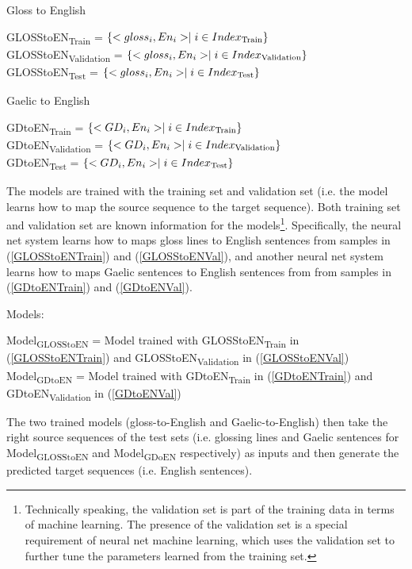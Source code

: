 \documentclass[a4paper]{article}
\begin{document}
\begin{exe}
	\ex Gloss to English
		\begin{xlist}
		\ex \label{GLOSStoENTrain} GLOSStoEN\textsubscript{Train}   = $\{<gloss_i,En_i>  \mid i \in Index\textsubscript{Train} \}$ \\
		\ex \label{GLOSStoENVal} GLOSStoEN\textsubscript{Validation}   = $\{<gloss_i,En_i>  \mid i \in Index\textsubscript{Validation} \}$ \\
		\ex \label{GLOSStoENTest}GLOSStoEN\textsubscript{Test} = $\{<gloss_i,En_i>  \mid i \in Index\textsubscript{Test} \}$ \\
		\end{xlist}
	
	\ex Gaelic to English
		\begin{xlist}
		\ex \label{GDtoENTrain} GDtoEN\textsubscript{Train}   = $\{<GD_i,En_i>  \mid i \in Index\textsubscript{Train} \}$ \\
		\ex \label{GDtoENVal} GDtoEN\textsubscript{Validation}   = $\{<GD_i,En_i>  \mid i \in Index\textsubscript{Validation} \}$ \\
		\ex \label{GDtoENTest} GDtoEN\textsubscript{Test}    = $\{<GD_i,En_i>  \mid i \in Index\textsubscript{Test} \}$ \\
		\end{xlist}
\end{exe}
The models are trained with the training set and validation set (i.e. the model learns how to map the source sequence to the target sequence). Both training set and validation set are known information for the models\footnote{Technically speaking, the validation set is part of the training data in terms of machine learning. The presence of the validation set is a special requirement of neural net machine learning, which uses the validation set to further tune the parameters learned from the training set.}. Specifically, the neural net system learns how to maps gloss lines to English sentences from samples in (\ref{GLOSStoENTrain}) and (\ref{GLOSStoENVal}), and another neural net system learns how to maps Gaelic sentences to English sentences from from samples in (\ref{GDtoENTrain}) and (\ref{GDtoENVal}). 

\begin{exe}
\ex Models: 
	\begin{xlist}
	\ex \label{ModelGlossToEN} Model\textsubscript{GLOSStoEN} = Model trained with GLOSStoEN\textsubscript{Train} in (\ref{GLOSStoENTrain}) and GLOSStoEN\textsubscript{Validation} in (\ref{GLOSStoENVal})
	\ex \label{ModelGDToEN}Model\textsubscript{GDtoEN} = Model trained with GDtoEN\textsubscript{Train} in (\ref{GDtoENTrain}) and GDtoEN\textsubscript{Validation} in (\ref{GDtoENVal}) 
	\end{xlist}	
\end{exe}
The two trained models (gloss-to-English and Gaelic-to-English) then take the right source sequences of the test sets (i.e. glossing lines and Gaelic sentences for Model\textsubscript{GLOSStoEN} and Model\textsubscript{GDoEN} respectively) as inputs and then generate the predicted target sequences (i.e. English sentences). 
\end{document}
